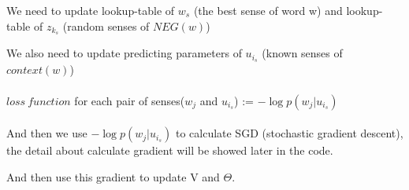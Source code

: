 \documentclass{scrartcl}
\begin{document}
	We need to update lookup-table of $w_s$ (the best sense of word w) and lookup-table of $z_{k_s}$ (random senses of $NEG(w)$)

	We also need to update predicting parameters of $u_{i_s}$ (known senses of $context(w)$)\\
\\
	$loss\ function$ for each pair of senses($w_j$ and $u_{i_s}$) := $-\log p(w_j | u_{i_s})$\\
\\
	And then we use $-\log p(w_j | u_{i_s})$ to calculate SGD (stochastic gradient descent),  the detail about calculate gradient will be showed later in the code.
	
	And then use this gradient to update V and $\Theta$.
\end{document}
